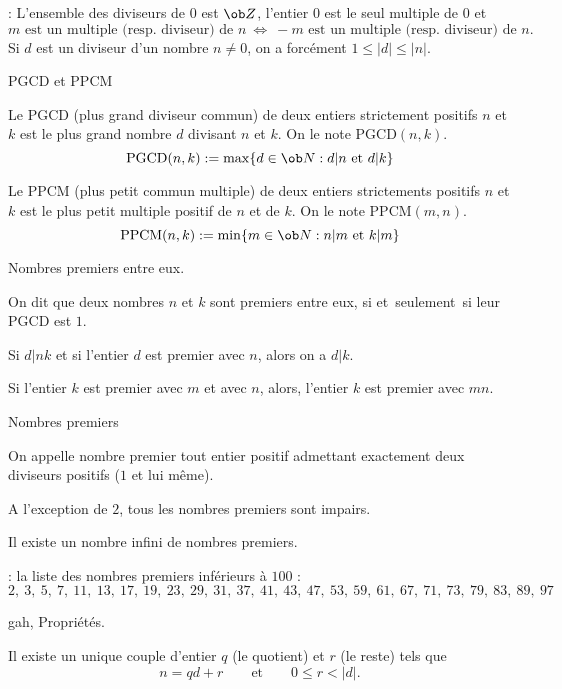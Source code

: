 \Remarque : L'ensemble des diviseurs de $0$ est $\ob Z$, l'entier $0$ est le seul multiple de $0$ et 
$$
m \mbox{ est un multiple (resp. diviseur) de }n\ \Longleftrightarrow\ -m \mbox{ est un multiple (resp. diviseur) de }n.
$$ 
Si $d$ est un diviseur d'un nombre $n\neq0$, on a forcément $1\le |d|\le |n|$. 
\bigskip

\Concept [] PGCD et PPCM

\Definition []  Le PGCD (plus grand diviseur commun) de deux entiers strictement positifs $n$ et $k$ est le plus grand nombre $d$ divisant $n$ et $k$. On le note 
$\mbox{PGCD}(n,k)$. 
$$
\mbox{PGCD}(n,k):=\max\{d\in\ob N:d|n\mbox{ et }d|k\}
$$ 

\Definition []  Le PPCM (plus petit commun multiple) de deux entiers strictements positifs $n$ et $k$ est le plus petit multiple positif de $n$ et de $k$. 
On le note $\mbox{PPCM}(m,n)$. 
$$
\mbox{PPCM}(n,k):=\min\{m\in\ob N:n|m\mbox{ et }k|m\}
$$ 

\Concept [] Nombres premiers entre eux. 

\Definition []  On dit que deux nombres $n$ et $k$ sont premiers entre eux, si et~seulement~si leur PGCD est $1$. 
\bigskip

\Theoreme [Title=Théorème de Gauss;$n$ et $k$ deux entiers strictements positifs]
Si $d|nk$ et si l'entier $d$ est premier avec $n$, alors on a $d|k$. 
\bigskip
  
\Propriete []  Si l'entier $k$ est premier avec $m$ et avec $n$, alors, l'entier $k$ est premier avec $mn$. 
\bigskip


\Concept [] Nombres premiers

\Definition []  On appelle nombre premier tout entier positif admettant exactement deux diviseurs positifs ($1$ et lui même).
\bigskip

\Propriete []  A l'exception de $2$, tous les nombres premiers sont impairs. 
\bigskip
 
\Propriete []  Il existe un nombre infini de nombres premiers. 
\bigskip

\Remarque : la liste des nombres premiers inférieurs à $100$ : 
$$
2,\ 3,\ 5,\ 7,\ 11,\ 13,\ 17,\ \!19,\ 23,\ 29,\ 31, \ 37, \ \!41,\ 43, \ 47,\ \!53, \ 59,\ 61,\ 67,\ 71,\ 73,\ 79,\ 83,\ 89,\ \!97
$$

\Subsection gah, Propriétés.

\Theoreme [$n\in\ob Z$ et $d\in\ob Z^*$;Title=Division euclidienne] 
Il existe un unique couple d'entier $q$ (le quotient) et $r$ (le reste) tels que 
$$
n=qd+r\qquad \mbox{et}\qquad 0\le r<|d|.
$$


